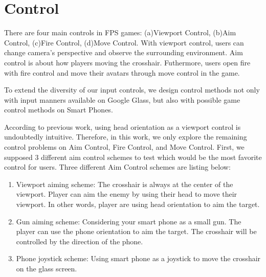 \documentclass{acm_proc_article-sp}
\begin{document}
\section{Control}
There are four main controls in FPS games: (a)Viewport Control, (b)Aim Control, (c)Fire Control, (d)Move Control.
With viewport control, users can change camera's perspective and observe the surrounding environment.
Aim control is about how players moving the crosshair.
Futhermore, users open fire with fire control and move their avatars through move control in the game.

To extend the diversity of our input controls, we design control methods not only with input manners available on Google Glass, but also with possible game control methods on Smart Phones.

According to previous work\cite{headvideo,tele,robot,viewport}, using head orientation as a viewport control is undoubtedly intuitive.%
Therefore, in this work, we only explore the remaining control problems on Aim Control, Fire Control, and Move Control. 
First, we supposed 3 different aim control schemes to test which would be the most favorite control for users. 
Three different Aim Control schemes are listing below:

\begin{enumerate}
\item Viewport aiming scheme: The crosshair is always at the center of the viewport. Player can aim the enemy by using their head to move their viewport. In other words, player are using head orientation to aim the target.

\item Gun aiming scheme: Considering your smart phone as a small gun. The player can use the phone orientation to aim the target. The crosshair will be controlled by the direction of the phone.

\item Phone joystick scheme: Using smart phone as a joystick to move the crosshair on the glass screen.
\end{enumerate}
\end{document}
